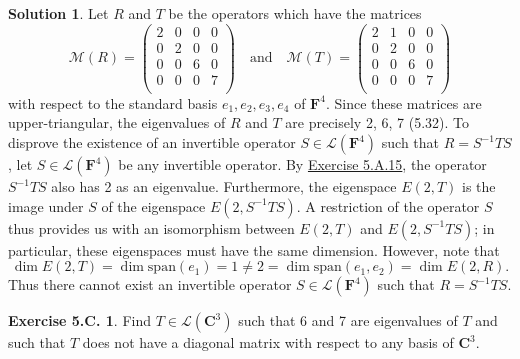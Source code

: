 \documentclass[12pt]{article}
\theoremstyle{definition}
\theoremstyle{exercise}
\newtheorem{exercise}{Exercise 5.C.}
\theoremstyle{solution}
\newtheorem*{solution}{Solution}
\newcommand{\lmap}{\mathcal{L}}
\newcommand{\mat}{\mathcal{M}}
\newcommand{\Span}{\text{span}}
\newcommand{\quand}{\quad \text{and} \quad}
\newcommand{\C}{\mathbf{C}}
\newcommand{\F}{\mathbf{F}}
\begin{document}
\begin{solution}
    Let \( R \) and \( T \) be the operators which have the matrices
    \[
        \mat(R) = \begin{pmatrix}
            2 & 0 & 0 & 0 \\
            0 & 2 & 0 & 0 \\
            0 & 0 & 6 & 0 \\
            0 & 0 & 0 & 7 \\
        \end{pmatrix}
        \quand
        \mat(T) = \begin{pmatrix}
            2 & 1 & 0 & 0 \\
            0 & 2 & 0 & 0 \\
            0 & 0 & 6 & 0 \\
            0 & 0 & 0 & 7 \\
        \end{pmatrix}
    \]
    with respect to the standard basis \( e_1, e_2, e_3, e_4 \) of \( \F^4 \). Since these matrices are upper-triangular, the eigenvalues of \( R \) and \( T \) are precisely 2, 6, 7 (5.32). To disprove the existence of an invertible operator \( S \in \lmap(\F^4) \) such that \( R = S^{-1}TS \), let \( S \in \lmap(\F^4) \) be any invertible operator. By \href{https://lew98.github.io/Mathematics/LADR_Section_5_A_Exercises.pdf}{Exercise 5.A.15}, the operator \( S^{-1}TS \) also has 2 as an eigenvalue. Furthermore, the eigenspace \( E(2, T) \) is the image under \( S \) of the eigenspace \( E(2, S^{-1}TS) \). A restriction of the operator \( S \) thus provides us with an isomorphism between \( E(2, T) \) and \( E(2, S^{-1}TS) \); in particular, these eigenspaces must have the same dimension. However, note that
    \[
        \dim E(2, T) = \dim \Span(e_1) = 1 \neq 2 = \dim \Span(e_1, e_2) = \dim E(2, R).
    \]
    Thus there cannot exist an invertible operator \( S \in \lmap(\F^4) \) such that \( R = S^{-1}TS \).
\end{solution}

\begin{exercise}
\label{ex:14}
    Find \( T \in \lmap(\C^3) \) such that 6 and 7 are eigenvalues of \( T \) and such that \( T \) does not have a diagonal matrix with respect to any basis of \( \C^3 \).
\end{exercise}
\end{document}
